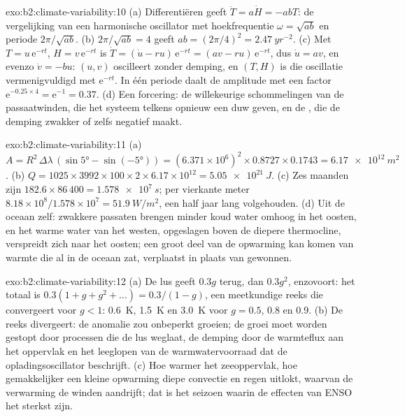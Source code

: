 \begin{solution}{exo:b2:climate-variability:10}
(a) Differentiëren geeft $\ddot T = a\dot H = -abT$: de vergelijking van een harmonische oscillator met
hoekfrequentie $\omega = \sqrt{ab}$ en periode $2\pi/\sqrt{ab}$. (b) $2\pi/\sqrt{ab} = 4$ geeft $ab =
(2\pi/4)^2 = \qty{2.47}{yr^{-2}}$. (c) Met $T = u\,\mathrm{e}^{-rt}$, $H = v\,\mathrm{e}^{-rt}$ is
$\dot T = (\dot u - ru)\,\mathrm{e}^{-rt} = (av - ru)\,\mathrm{e}^{-rt}$, dus $\dot u = av$, en
evenzo $\dot v = -bu$: $(u, v)$ oscilleert zonder demping, en $(T, H)$ is die oscillatie
vermenigvuldigd met $\mathrm{e}^{-rt}$. In één periode daalt de amplitude met een factor $\mathrm{e}^{-0.25 \times
4} = \mathrm{e}^{-1} = 0.37$. (d) Een forcering: de willekeurige schommelingen van de passaatwinden, die
het systeem telkens opnieuw een duw geven, en de , die de demping zwakker of
zelfs negatief maakt.
\end{solution}

\begin{solution}{exo:b2:climate-variability:11}
(a) $A = R^2 \,\Delta\lambda\,(\sin\ang{5} - \sin(\ang{-5})) = (6.371 \times 10^6)^2 \times 0.8727
\times 0.1743 = \qty{6.17e12}{m^2}$. (b) $Q = 1025 \times 3992 \times 100 \times 2 \times 6.17
\times 10^{12} = \qty{5.05e21}{J}$. (c) Zes maanden zijn $182.6 \times 86\,400 = \qty{1.578e7}{s}$;
per vierkante meter $8.18 \times 10^8/1.578 \times 10^7 = \qty{51.9}{W/m^2}$, een half jaar lang
volgehouden. (d) Uit de oceaan zelf: zwakkere passaten brengen minder koud water omhoog in het oosten, en het warme
water van het westen, opgeslagen boven de diepere thermocline, verspreidt zich naar het oosten; een groot deel van de opwarming
kan komen van warmte die al in de oceaan zat, verplaatst in plaats van gewonnen.
\end{solution}

\begin{solution}{exo:b2:climate-variability:12}
(a) De lus geeft $0.3g$ terug, dan $0.3g^2$, enzovoort: het totaal is $0.3(1 + g + g^2 + \dots) =
0.3/(1 - g)$, een meetkundige reeks die convergeert voor $g < 1$: \qty{0.6}{K}, \qty{1.5}{K} en
\qty{3.0}{K} voor $g = 0.5$, 0.8 en 0.9. (b) De reeks divergeert: de anomalie zou onbeperkt
groeien; de groei moet worden gestopt door processen die de lus weglaat, de demping door de warmteflux
aan het oppervlak en het leeglopen van de warmwatervoorraad dat de opladingsoscillator beschrijft. (c)
Hoe warmer het zeeoppervlak, hoe gemakkelijker een kleine opwarming diepe convectie en regen uitlokt,
waarvan de verwarming de winden aandrijft; dat is het seizoen waarin de effecten van ENSO het sterkst zijn.
\end{solution}

